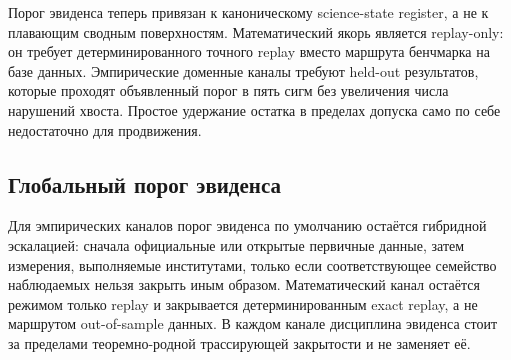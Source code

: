 Порог эвиденса теперь привязан к каноническому science-state register, а не к плавающим сводным поверхностям. Математический якорь является replay-only: он требует детерминированного точного replay вместо маршрута бенчмарка на базе данных. Эмпирические доменные каналы требуют held-out результатов, которые проходят объявленный порог в пять сигм без увеличения числа нарушений хвоста. Простое удержание остатка в пределах допуска само по себе недостаточно для продвижения.

\subsection{Глобальный порог эвиденса}
Для эмпирических каналов порог эвиденса по умолчанию остаётся гибридной эскалацией: сначала официальные или открытые первичные данные, затем измерения, выполняемые институтами, только если соответствующее семейство наблюдаемых нельзя закрыть иным образом. Математический канал остаётся режимом только replay и закрывается детерминированным exact replay, а не маршрутом out-of-sample данных. В каждом канале дисциплина эвиденса стоит за пределами теоремно-родной трассирующей закрытости и не заменяет её.

